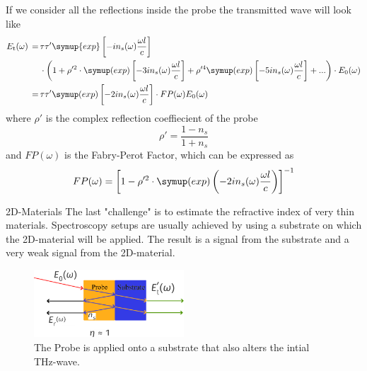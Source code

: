 \documentclass[aspectratio=1610, 9pt]{beamer}
\begin{document}
\begin{frame}
  If we consider all the reflections inside the probe the transmitted wave will look like
  \begin{align*}
    E_\text{t}(\omega) \,=\,& \tau \tau' \symup{exp} \left[-i n_s(\omega) \frac{\omega l }{c}\right] \\
                        & \cdot \left( 1 + \rho'^2 \cdot \symup(exp)\left[ -3 i n_s(\omega) \frac{\omega l }{c}\right] + \rho'^4 \symup(exp) \left[ -5 i n_s(\omega) \frac{\omega l }{c}\right] + ...\right) \cdot E_0 (\omega) \\
                        \,=\,& \tau \tau' \symup(exp)\left[ -2 i n_s(\omega) \frac{\omega l }{c}\right] \cdot FP(\omega) E_0(\omega)
  \end{align*}
  where $\rho'$ is the complex reflection coeffiecient of the probe
  \begin{equation}
    \rho' = \frac{1 - n_s}{1 + n_s}
  \end{equation}
  and $FP(\omega)$ is the Fabry-Perot Factor, which can be expressed as 
  \begin{equation}
    FP(\omega) = \left[1 - \rho'^2 \cdot \symup(exp)\left(- 2 i n_s(\omega )\frac{\omega l }{c}\right)\right]^{-1}
  \end{equation}
\end{frame}

\begin{frame}{2D-Materials}
  The last "challenge" is to estimate the refractive index of very thin materials.
  Spectroscopy setups are usually achieved by using a substrate on which the 2D-material will be applied.
  The result is a signal from the substrate and a very weak signal from the 2D-material.
  \begin{figure}
    \includegraphics[width=0.5\textwidth]{images/2d.pdf}
    \caption{The Probe is applied onto a substrate that also alters the intial THz-wave.}
  \end{figure}
\end{frame}
\end{document}
